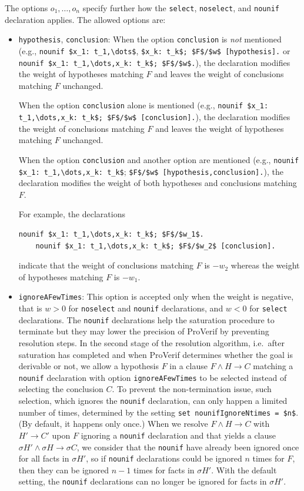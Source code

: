 \documentclass{book}
\begin{document}
The options $o_1, \dots, o_n$ specify further how the \lstinline!select!, \lstinline!noselect!, and \lstinline!nounif! declaration applies.
The allowed options are:
\begin{itemize}

\item \lstinline{hypothesis}, \lstinline{conclusion}:
When the option \lstinline{conclusion} is \emph{not} mentioned (e.g., \lstinline!nounif $x_1: t_1,\dots$!, \lstinline!$x_k: t_k$; $F$/$w$ [hypothesis].! or \lstinline!nounif $x_1: t_1,\dots,x_k: t_k$; $F$/$w$.!), the declaration modifies the weight of hypotheses matching $F$ and leaves the weight of conclusions matching $F$ unchanged.

When the option \lstinline{conclusion} alone is mentioned (e.g., \lstinline!nounif $x_1: t_1,\dots,x_k: t_k$; $F$/$w$ [conclusion].!), the declaration modifies the weight of conclusions matching $F$ and leaves the weight of hypotheses matching $F$ unchanged.

When the option \lstinline{conclusion} and another option are mentioned (e.g., \lstinline!nounif $x_1: t_1,\dots,x_k: t_k$!; \lstinline!$F$/$w$ [hypothesis,conclusion].!), the declaration modifies the weight of both hypotheses and conclusions matching $F$.

For example, the declarations
\begin{lstlisting}[numbers=none]
	nounif $x_1: t_1,\dots,x_k: t_k$; $F$/$w_1$.
	nounif $x_1: t_1,\dots,x_k: t_k$; $F$/$w_2$ [conclusion].
\end{lstlisting}
indicate that the weight of conclusions matching $F$ is $-w_2$ whereas the weight of hypotheses matching $F$ is $-w_1$.

\item \lstinline{ignoreAFewTimes}:
This option is accepted only when the weight is negative, that is $w > 0$ for \lstinline{noselect} and \lstinline{nounif} declarations, and $w <0$ for \lstinline{select} declarations.
The \lstinline!nounif! declarations help the saturation procedure to terminate but they may lower the precision of ProVerif by preventing resolution steps. In the second stage of the resolution algorithm, i.e.~after saturation has completed and when ProVerif determines whether the goal is derivable or not, we allow a hypothesis $F$ in a clause $F \wedge H \rightarrow C$ matching a \lstinline!nounif! declaration with option \lstinline!ignoreAFewTimes! to be selected instead of selecting the conclusion $C$. To prevent the non-termination issue, such selection, which ignores the \lstinline!nounif! declaration, can only happen a limited number of times, determined by the setting \lstinline!set nounifIgnoreNtimes = $n$!. (By default, it happens only once.) When we resolve $F \wedge H \rightarrow C$ with $H' \rightarrow C'$ upon $F$ ignoring a \lstinline!nounif! declaration and that yields a clause $\sigma H' \wedge \sigma H \rightarrow \sigma C$, we consider that the \lstinline!nounif!  have already been ignored once for all facts in $\sigma H'$, so if \lstinline!nounif! declarations could be ignored $n$ times for $F$, then they can be ignored $n-1$ times for facts in $\sigma H'$. With the default setting, the \lstinline!nounif! declarations can no longer be ignored for facts in $\sigma H'$.


\end{itemize}
\end{document}

